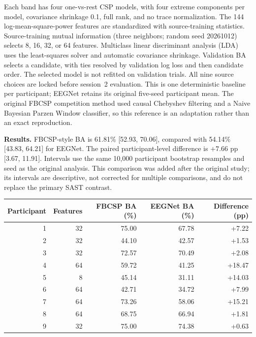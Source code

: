 \documentclass[11pt,a4paper]{article}
\begin{document}
Each band has four one-vs-rest CSP models, with four extreme components
per model, covariance shrinkage 0.1, full rank, and no trace normalization.
The 144 log-mean-square-power features are standardized with source-training
statistics. Source-training mutual information (three neighbors; random
seed 20261012) selects 8, 16, 32, or 64 features. Multiclass linear discriminant
analysis (LDA) uses the
least-squares solver and automatic covariance shrinkage. Validation BA
selects a candidate, with ties resolved by validation log loss and then
candidate order. The selected model is not refitted on validation trials.
All nine source choices are locked before session~2 evaluation. This is one
deterministic baseline per participant; EEGNet retains its original five-seed
participant mean. The original FBCSP competition method used causal
Chebyshev filtering and a Naive Bayesian Parzen Window classifier, so this
reference is an adaptation rather than an exact reproduction.

\textbf{Results.} FBCSP-style BA is 61.81\% [52.93, 70.06], compared with
54.14\% [43.83, 64.21] for EEGNet. The paired participant-level difference is
$+7.66$ pp [3.67, 11.91]. Intervals use the same 10,000 participant bootstrap
resamples and seed as the original analysis. This comparison was added
after the original study; its intervals are descriptive, not corrected for
multiple comparisons, and do not replace the primary SAST contrast.

\begin{center}\small
\begin{tabular}{rrrrr}
\toprule
Participant & Features & FBCSP BA (\%) & EEGNet BA (\%) & Difference (pp) \\
\midrule
1 & 32 & 75.00 & 67.78 & +7.22 \\
2 & 32 & 44.10 & 42.57 & +1.53 \\
3 & 32 & 72.57 & 70.49 & +2.08 \\
4 & 64 & 59.72 & 41.25 & +18.47 \\
5 & 8 & 45.14 & 31.11 & +14.03 \\
6 & 64 & 42.71 & 34.72 & +7.99 \\
7 & 64 & 73.26 & 58.06 & +15.21 \\
8 & 64 & 68.75 & 66.94 & +1.81 \\
9 & 32 & 75.00 & 74.38 & +0.63 \\
\bottomrule
\end{tabular}
\end{center}
\end{document}
